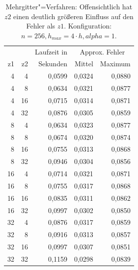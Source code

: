 \documentclass[paper = a4]{scrartcl}
\begin{document}
\begin{table}
    \centering
    \begin{tabular}{|r|r|r|r|r|} \hline
    & & Laufzeit in & \multicolumn{2}{c|}{Approx. Fehler} \\
    z1 & z2 & Sekunden & Mittel & Maximum \\ \hline \hline
    4  & 4  & 0,0599   & 0,0324 & 0,0880  \\
    4  & 8  & 0,0634   & 0,0321 & 0,0877  \\
    4  & 16 & 0,0715   & 0,0314 & 0,0871  \\
    4  & 32 & 0,0876   & 0,0305 & 0,0859  \\ \hline
    8  & 4  & 0,0634   & 0,0323 & 0,0877  \\
    8  & 8  & 0,0674   & 0,0320 & 0,0874  \\
    8  & 16 & 0,0755   & 0,0313 & 0,0868  \\
    8  & 32 & 0,0946   & 0,0304 & 0,0856  \\ \hline
    16 & 4  & 0,0714   & 0,0321 & 0,0871  \\
    16 & 8  & 0,0755   & 0,0317 & 0,0868  \\
    16 & 16 & 0,0835   & 0,0311 & 0,0862  \\
    16 & 32 & 0,0997   & 0,0302 & 0,0850  \\ \hline
    32 & 4  & 0,0876   & 0,0317 & 0,0859  \\
    32 & 8  & 0,0916   & 0,0313 & 0,0857  \\
    32 & 16 & 0,0997   & 0,0307 & 0,0851  \\
    32 & 32 & 0,1159   & 0,0298 & 0,0839  \\ \hline
    \end{tabular}
    \caption{Mehrgitter"=Verfahren: Offensichtlich hat \(z2\) einen deutlich größeren Einfluss auf den Fehler als \(z1\). Konfiguration: \(n=256, h_{max}=4 \cdot h, alpha=1\).}
    \label{tab:b}
\end{table}
\end{document}
